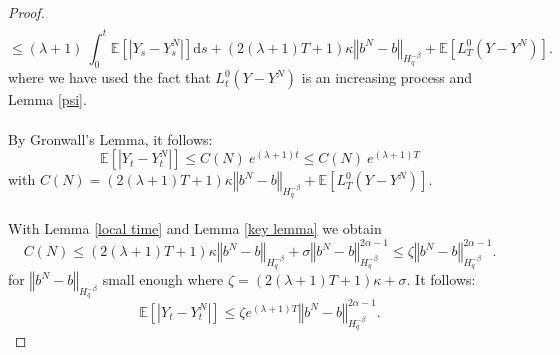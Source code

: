 \documentclass[11pt]{article}
\newcommand{\norme}[1]{\left\Vert #1\right\Vert}
\newcommand{\E}{\mathbb{E}}
\newcommand{\di}{\mathrm{d}}
\begin{document}
\begin{proof}
\begin{multline*}
    \end{multline*}    
    \begin{equation*}
    \leq (\lambda + 1)\ \int_0^t\E\left[\left|Y_s-Y_s^N\right|\right] \di s + (2(\lambda + 1)T+1)\kappa\norme{b^N-b}_{H^{-\beta}_{q}}  + \E \left[L_T^0(Y-Y^N)\right].
    \end{equation*}
    where we have used the fact that $L_t^0(Y-Y^N)$ is an increasing process and Lemma \ref{psi}.    
    \paragraph{}
    By Gronwall's Lemma, it follows:
    \begin{equation}\label{gronwall}
    \E\left[\left|Y_t-Y_t^N\right|\right] \leq C(N)\ e^{(\lambda + 1)t}\leq C(N)\ e^{(\lambda + 1)T}
    \end{equation}
    with $C(N) = (2(\lambda + 1)T+1)\kappa\norme{b^N-b}_{H^{-\beta}_{q}}  + \E \left[L_T^0(Y-Y^N)\right].$      
    
    \paragraph{}
    With Lemma \ref{local time} and Lemma \ref{key lemma} we obtain \begin{equation*}
    C(N) \leq (2(\lambda + 1)T+1)\kappa\norme{b^N-b}_{H^{-\beta}_{q}}   + \sigma\norme{b^N-b}_{H^{-\beta}_{q}}^{2\alpha-1} \leq \zeta \norme{b^N-b}_{H^{-\beta}_{q}}^{2\alpha-1}.
    \end{equation*}   
    for $\norme{b^N-b}_{H^{-\beta}_{q}}$ small enough where $\zeta = (2(\lambda + 1)T+1)\kappa + \sigma $. It follows:
    \begin{equation}\label{gronfinal}
    \E\left[\left|Y_t-Y_t^N\right|\right] \leq \zeta e^{(\lambda + 1)T} \norme{b^N-b}_{H^{-\beta}_{q}}^{2\alpha-1}.
    \end{equation}
    

\end{proof}
\end{document}
